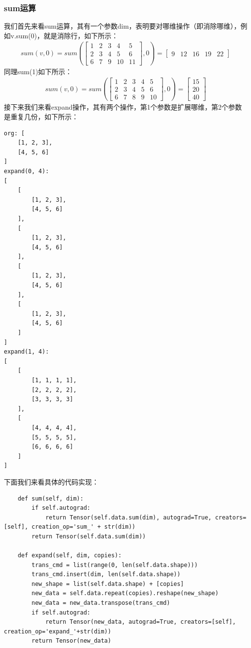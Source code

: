 \subsubsection{sum运算}
我们首先来看sum运算，其有一个参数dim，表明要对哪维操作（即消除哪维），例如v.sum(0)，就是消除行，如下所示：
\begin{equation}
\begin{aligned}
sum(v, 0)=sum(\begin{bmatrix}
	1 & 2 & 3 & 4 & 5 \\
	2 & 3 & 4 & 5 & 6 \\
	6 & 7 & 9 & 10 & 11 
\end{bmatrix}, 0)=\begin{bmatrix}
	9 & 12 & 16 & 19 & 22
\end{bmatrix}
\end{aligned}
\label{chpZ01-sum-dim-0-demo}
\end{equation}
同理sum(1)如下所示：
\begin{equation}
\begin{aligned}
sum(v, 0)=sum(\begin{bmatrix}
	1 & 2 & 3 & 4 & 5 \\
	2 & 3 & 4 & 5 & 6 \\
	6 & 7 & 8 & 9 & 10 
\end{bmatrix}, 0)=\begin{bmatrix}
	15 \\
	20 \\
	40
\end{bmatrix}
\end{aligned}
\label{chpZ01-sum-dim-1-demo}
\end{equation}
接下来我们来看expand操作，其有两个操作，第1个参数是扩展哪维，第2个参数是重复几份，如下所示：
\begin{lstlisting}
org: [
	[1, 2, 3],
	[4, 5, 6]
]
expand(0, 4):
[
	[
		[1, 2, 3],
		[4, 5, 6]
	],
	[
		[1, 2, 3],
		[4, 5, 6]
	],
	[
		[1, 2, 3],
		[4, 5, 6]
	],
	[
		[1, 2, 3],
		[4, 5, 6]
	]
]
expand(1, 4):
[
	[
		[1, 1, 1, 1],
		[2, 2, 2, 2],
		[3, 3, 3, 3]
	],
	[
		[4, 4, 4, 4],
		[5, 5, 5, 5],
		[6, 6, 6, 6]
	]
]
\end{lstlisting}
下面我们来看具体的代码实现：
\begin{lstlisting}
    def sum(self, dim):
        if self.autograd:
            return Tensor(self.data.sum(dim), autograd=True, creators=[self], creation_op='sum_' + str(dim))
        return Tensor(self.data.sum(dim))

    def expand(self, dim, copies):
        trans_cmd = list(range(0, len(self.data.shape)))
        trans_cmd.insert(dim, len(self.data.shape))
        new_shape = list(self.data.shape) + [copies]
        new_data = self.data.repeat(copies).reshape(new_shape)
        new_data = new_data.transpose(trans_cmd)
        if self.autograd:
            return Tensor(new_data, autograd=True, creators=[self], creation_op='expand_'+str(dim))
        return Tensor(new_data)
\end{lstlisting}
